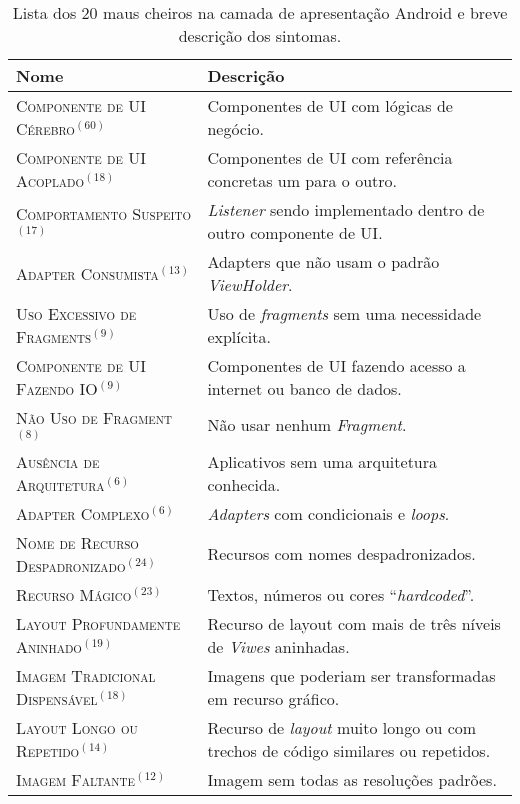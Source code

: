 \begin{table}[h!]
\centering
\renewcommand*{\arraystretch}{1}
\caption{Lista dos 20 maus cheiros na camada de apresentação Android e breve descrição dos sintomas.}
\footnotesize
\begin{tabular}{@{}p{6.6cm}@{}p{10cm}@{}}
\toprule
\textbf{Nome} & \textbf{Descrição} \\
\toprule
\textsc{Componente de UI Cérebro}$^{(60)}$            & Componentes de UI com lógicas de negócio.  \\
\textsc{Componente de UI Acoplado}$^{(18)}$           & Componentes de UI com referência concretas um para o outro.  \\
\textsc{Comportamento Suspeito}$^{(17)}$              & \textit{Listener} sendo implementado dentro de outro componente de UI.  \\
\textsc{Adapter Consumista}$^{(13)}$                  & Adapters que não usam o padrão \textit{ViewHolder}.  \\
\textsc{Uso Excessivo de Fragments}$^{(9)}$           & Uso de \textit{fragments} sem uma necessidade explícita. \\
\textsc{Componente de UI Fazendo IO}$^{(9)}$          & Componentes de UI fazendo acesso a internet ou banco de dados.  \\
\textsc{Não Uso de Fragment}$^{(8)}$                  & Não usar nenhum \textit{Fragment}.  \\
\textsc{Ausência de Arquitetura}$^{(6)}$              & Aplicativos sem uma arquitetura conhecida.  \\
\textsc{Adapter Complexo}$^{(6)}$                     & \textit{Adapters} com condicionais e \textit{loops}. \\
\textsc{Nome de Recurso Despadronizado}$^{(24)}$      & Recursos com nomes despadronizados.      \\
\textsc{Recurso Mágico}$^{(23)}$                      & Textos, números ou cores ``\textit{hardcoded}''.   \\
\textsc{Layout Profundamente Aninhado}$^{(19)}$       & Recurso de layout com mais de três níveis de \textit{Viwes} aninhadas.   \\
\textsc{Imagem Tradicional Dispensável}$^{(18)}$      & Imagens que poderiam ser transformadas em recurso gráfico.   \\
\textsc{Layout Longo ou Repetido}$^{(14)}$            & Recurso de \textit{layout} muito longo ou com trechos de código similares ou repetidos.   \\
\textsc{Imagem Faltante}$^{(12)}$                     & Imagem sem todas as resoluções padrões.   \\

\end{tabular}
\end{table}
